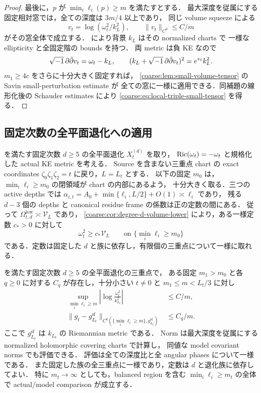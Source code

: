 \begin{proof}
最後に，$p$ が $\min_i\ell_i(p)\ge m$ を満たすとする．
最大深度を従属にする固定相対窓では，全ての深度は $3m/4$ 以上であり，
同じ volume squeeze による
\[
 v_t=\log(\omega_t^2/k_L^2),\qquad \|v_t\|_{C^0}\le C/m
\]
がその窓全体で成立する．
 により背景 $k_L$ はその normalized charts で
一様な ellipticity と全固定階の bounds を持つ．
両 metric は負 KE なので
\[
 \sqrt{-1}\,\partial\bar\partial v_t=\omega_t-k_L,\qquad
 (k_L+\sqrt{-1}\,\partial\bar\partial v_t)^2=e^{v_t}k_L^2.
\]
$m_1\ge4c$ をさらに十分大きく固定すれば，
\cref{coarse:lem:small-volume-tensor} の Savin small-perturbation estimate が
全ての窓に一様に適用できる．同補題の線形化後の Schauder estimates により
\eqref{coarse:eq:local-triple-small-tensor} を得る．
\end{proof}

\subsection{固定次数の全平面退化への適用}

 を満たす固定次数 $d\ge5$ の全平面退化 $X_t^{(d)}$ を取り，
$\operatorname{Ric}(\omega_t)=-\omega_t$ と規格化した actual KE metric を考える．
Source を含まない三重点 chart の exact coordinates
$\zeta_0\zeta_1\zeta_2=t$ に戻り，$L=L_t$ とする．
以下の固定 $m_0$ は，$\min_i\ell_i\ge m_0$ の閉領域が chart の内部にあるよう，
十分大きく取る．三つの active depths では
$\alpha_{i,t}=A_0+\min\{\ell_i,L/2\}+O(1)\asymp\ell_i$ であり，
残る $d-3$ 個の depths と canonical residue frame の係数は正の定数の間にある．
従って $\Omega_{t,d}^{\mathrm{low}}\asymp\mathcal V_L$ であり，
\cref{coarse:cor:degree-d-volume-lower} により，ある一様定数 $c_*>0$ に対して
\begin{equation}\label{coarse:eq:actual-simplex-density-floor}
 \omega_t^2\ge c_*\mathcal V_L
 \qquad\text{on }\{\min_i\ell_i\ge m_0\}
\end{equation}
である．定数は固定した $d$ と族に依存し，有限個の三重点について一様に取れる．

\begin{theorem}
\label{coarse:thm:full-triple-tensor}
 を満たす固定次数 $d\ge5$ の全平面退化の三重点で，
ある固定 $m_1>m_0$ と各 $q\ge0$ に対する
$C_q$ が存在し，十分小さい $t\ne0$ と $m_1\le m<L_t/3$ に対し
\begin{align}
 \sup_{\min_i\ell_i\ge m}
   \left|\log\frac{\omega_t^2}{k_{L_t}^2}\right|
  &\le C/m,
       \label{coarse:eq:full-triple-small-volume}\\
 \|g_t-g_{L_t}^{\mathrm{sf}}\|_{C^q(\{\min_i\ell_i\ge m\},g_{L_t}^{\mathrm{sf}})}
  &\le C_q/m.
       \label{coarse:eq:full-triple-small-tensor}
\end{align}
ここで $g_{L_t}^{\mathrm{sf}}$ は $k_{L_t}$ の Riemannian metric である．
Norm は最大深度を従属にする normalized holomorphic covering charts で計算し，
同値な model covariant norms でも評価できる．
評価は全ての深度比と全 angular phases について一様である．
また固定した族の全三重点に一様であり，定数は $d$ と退化族に依存してよい．
特に $m_t\to\infty$ としても，balanced region を含む
$\min_i\ell_i\ge m_t$ の全体で actual/model comparison が成立する．
\end{theorem}

